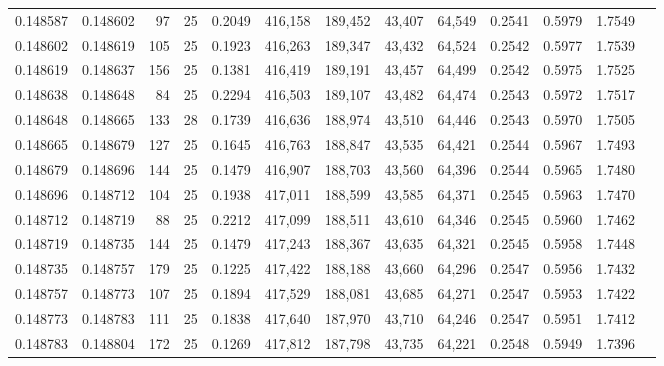 \begin{tabular}{rrrrrrrrrrrrr}
0.148587 & 0.148602 &    97 &  25 &                                     0.2049 & 416,158 & 189,452 &  43,407 &  64,549 & 0.2541 & 0.5979 & 1.7549 \\
0.148602 & 0.148619 &   105 &  25 &                                     0.1923 & 416,263 & 189,347 &  43,432 &  64,524 & 0.2542 & 0.5977 & 1.7539 \\
0.148619 & 0.148637 &   156 &  25 &                                     0.1381 & 416,419 & 189,191 &  43,457 &  64,499 & 0.2542 & 0.5975 & 1.7525 \\
0.148638 & 0.148648 &    84 &  25 &                                     0.2294 & 416,503 & 189,107 &  43,482 &  64,474 & 0.2543 & 0.5972 & 1.7517 \\
0.148648 & 0.148665 &   133 &  28 &                                     0.1739 & 416,636 & 188,974 &  43,510 &  64,446 & 0.2543 & 0.5970 & 1.7505 \\
0.148665 & 0.148679 &   127 &  25 &                                     0.1645 & 416,763 & 188,847 &  43,535 &  64,421 & 0.2544 & 0.5967 & 1.7493 \\
0.148679 & 0.148696 &   144 &  25 &                                     0.1479 & 416,907 & 188,703 &  43,560 &  64,396 & 0.2544 & 0.5965 & 1.7480 \\
0.148696 & 0.148712 &   104 &  25 &                                     0.1938 & 417,011 & 188,599 &  43,585 &  64,371 & 0.2545 & 0.5963 & 1.7470 \\
0.148712 & 0.148719 &    88 &  25 &                                     0.2212 & 417,099 & 188,511 &  43,610 &  64,346 & 0.2545 & 0.5960 & 1.7462 \\
0.148719 & 0.148735 &   144 &  25 &                                     0.1479 & 417,243 & 188,367 &  43,635 &  64,321 & 0.2545 & 0.5958 & 1.7448 \\
0.148735 & 0.148757 &   179 &  25 &                                     0.1225 & 417,422 & 188,188 &  43,660 &  64,296 & 0.2547 & 0.5956 & 1.7432 \\
0.148757 & 0.148773 &   107 &  25 &                                     0.1894 & 417,529 & 188,081 &  43,685 &  64,271 & 0.2547 & 0.5953 & 1.7422 \\
0.148773 & 0.148783 &   111 &  25 &                                     0.1838 & 417,640 & 187,970 &  43,710 &  64,246 & 0.2547 & 0.5951 & 1.7412 \\
0.148783 & 0.148804 &   172 &  25 &                                     0.1269 & 417,812 & 187,798 &  43,735 &  64,221 & 0.2548 & 0.5949 & 1.7396 \\

\end{tabular}
